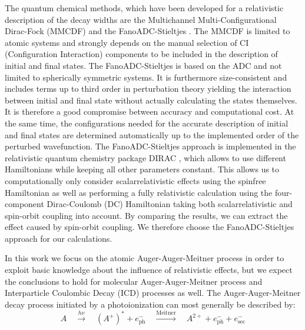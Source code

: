 The quantum chemical methods, which have been developed for a relativistic
description of the decay widths are the Multichannel Multi-Configurational
Dirac-Fock (MMCDF) \cite{Fritzsche11} and the FanoADC-Stieltjes \cite{Fasshauer15_1}.
The MMCDF is limited to atomic systems and strongly depends on
the manual selection of CI (Configuration
Interaction) components to be included in the description of initial and      
final states.
The FanoADC-Stieltjes is based on the ADC and not limited to spherically symmetric
systems.
It is furthermore size-consistent and includes terms up to third order
in perturbation theory yielding the interaction between initial and final state
without actually calculating the states themselves.
It is therefore a good compromise between
accuracy and computational cost. At the same time, the configurations needed for the
accurate description of initial and final states are determined automatically up to
the implemented order of the perturbed wavefunction.
The FanoADC-Stieltjes approach is implemented in the relativistic
quantum chemistry package
DIRAC \cite{DIRAC17}, which allows to use different Hamiltonians while keeping
all other parameters constant. This allows us to computationally only consider
scalarrelativistic effects using the spinfree Hamiltonian as well as
performing a fully relativistic calculation using the four-component
Dirac-Coulomb (DC) Hamiltonian taking both scalarrelativistic and
spin-orbit coupling into account.
By comparing the results, we can extract the effect caused by spin-orbit coupling.
We therefore choose the FanoADC-Stieltjes approach for our calculations.


In this work we focus on the atomic Auger-Auger-Meitner process     
in order                                      
to exploit basic knowledge about the influence of relativistic effects,
but we expect the conclusions to hold for molecular Auger-Auger-Meitner process and
Interparticle Coulombic Decay (ICD) processes
\cite{Cederbaum97,Marburger03,Hergenhahn11,Jahnke15} as well.
The Auger-Auger-Meitner decay process initiated by a photoionization
can most generally be described by:
\begin{equation*}                                               
 A \quad \xrightarrow{h\nu}\quad (A^+)^* + e^-_\text{ph} \quad       
    \xrightarrow{\text{Meitner}} \quad A^{2+} + e^-_\text{ph} + e^-_\text{sec}     
\end{equation*}                                                 
                                                                
